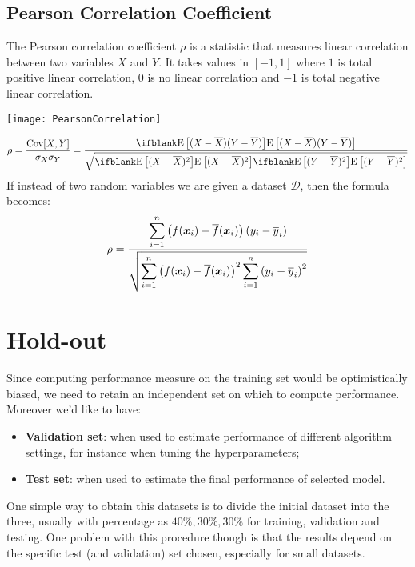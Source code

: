 \subsection{Pearson Correlation Coefficient}
The Pearson correlation coefficient $\rho$ is a statistic that measures linear correlation between two variables $X$ and $Y$. It takes values in $[-1,1]$ where $1$ is total positive linear correlation, $0$ is no linear correlation and $-1$ is total negative linear correlation. 
\begin{center}
  \texttt{[image: PearsonCorrelation]}
\end{center}
\[\rho=\frac{\Cov{X,Y}}{\sigma_X\sigma_Y}=\frac{\E{(X-\overline{X})(Y-\overline{Y})}}{\sqrt{\E{(X-\overline{X})^2}\E{(Y-\overline{Y})^2}}}\]
If instead of two random variables we are given a dataset $\mathcal{D}$, then the formula becomes:
\[\rho=\dfrac{\displaystyle\sum_{i=1}^n\left(f(\bm{x}_i)-\overline{f}(\bm{x}_i)\right)\left(y_i-\overline{y}_i\right)}{\sqrt{\displaystyle\sum_{i=1}^n\left(f(\bm{x}_i)-\overline{f}(\bm{x}_i)\right)^2\displaystyle\sum_{i=1}^n\left(y_i-\overline{y}_i\right)^2}}\]
%
%
%
\section{Hold-out}
Since computing performance measure on the training set would be optimistically biased, we need to retain an independent set on which to compute performance. Moreover we'd like to have:
\begin{itemize}
  \item \textbf{Validation set}: when used to estimate performance of different algorithm settings, for instance when tuning the hyperparameters;
  \item \textbf{Test set}: when used to estimate the final performance of selected model.
\end{itemize}
One simple way to obtain this datasets is to divide the initial dataset into the three, usually with percentage as $40\%,30\%,30\%$ for training, validation and testing.
One problem with this procedure though is that the results depend on the specific test (and validation) set chosen, especially for small datasets. \newline
%
%
%
